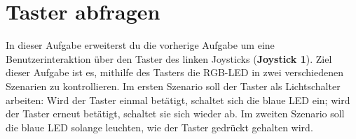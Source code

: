 \section{\ExercisePrefixEmbeddedC Taster abfragen \optional}

\optionaltextbox

In dieser Aufgabe erweiterst du die vorherige Aufgabe um eine Benutzerinteraktion über den Taster des linken Joysticks (\textbf{Joystick 1}).
Ziel dieser Aufgabe ist es, mithilfe des Tasters die RGB-LED in zwei verschiedenen Szenarien zu kontrollieren.
Im ersten Szenario soll der Taster als Lichtschalter arbeiten: Wird der Taster einmal betätigt, schaltet sich die blaue LED ein; wird der Taster erneut betätigt, schaltet sie sich wieder ab.
Im zweiten Szenario soll die blaue LED solange leuchten, wie der Taster gedrückt gehalten wird.

